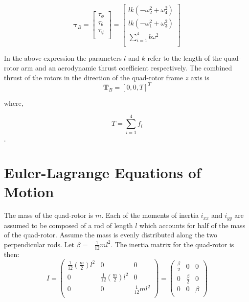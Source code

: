 \begin{equation}
    \label{taub}
    \boldsymbol \tau_B = \left[ \begin{array}{c} \tau_{\phi}\\\tau_{\theta}\\\tau_{\psi}\\ \end{array} \right] = \left[ \begin{array}{c} l k (-\omega_2^2 + \omega_4^2)\\l k (-\omega_1^2 + \omega_3^2)\\ \displaystyle \sum \limits_{i=1}^4 b \omega^2\\\end{array} \right]
\end{equation}

In the above expression the parameters $l$ and $k$ refer to the length of the quad-rotor arm and an aerodynamic thrust coefficient respectively. The combined thrust of the rotors in the direction of the quad-rotor frame $z$ axis is\\
\begin{equation}
\boldsymbol T_B = [0, 0, T]^T
\end{equation}

where,

\begin{equation}
    \label{totalThrust}
    T =  \displaystyle \sum \limits_{i=1}^4 f_i
\end{equation}.



\section{Euler-Lagrange Equations of Motion}


\noindent
The mass of the quad-rotor is $m$. Each of the moments of inertia  $ i_{xx} $  and $ i_{yy} $
are assumed to be composed of a rod of length $ l $   which accounts for half of the mass of the quad-rotor. Assume the mass
is evenly distributed along the two perpendicular rods. Let  \(\beta  =\text{  }\frac{1}{12}m l^2 \). The inertia matrix for the quad-rotor is then: \\

\begin{equation}
I = \left(
\begin{array}{ccc}
 \frac{1}{12}\left(\frac{m}{2}\right)l^2 & 0 & 0 \\
 0 & \frac{1}{12}\left(\frac{m}{2}\right)l^2 & 0 \\
 0 & 0 & \frac{1}{12}m l^2 \\
\end{array}
\right) = \left(
\begin{array}{ccc}
 \frac{\beta }{2} & 0 & 0 \\
 0 & \frac{\beta }{2} & 0 \\
 0 & 0 & \beta  \\
\end{array}
\right)
\end{equation}

